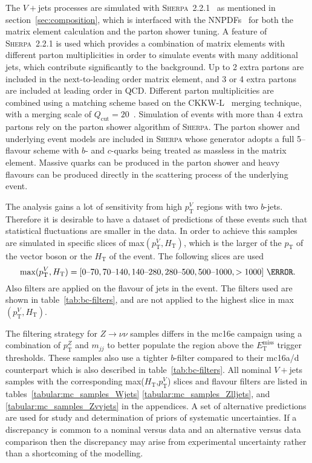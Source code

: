 The $V+$jets processes are simulated with
\textsc{Sherpa}~2.2.1~\cite{1126-6708-2009-02-007} as mentioned in
section~\ref{sec:composition}, which is interfaced with the
NNPDFs~\cite{Ball:2012cx} for both the matrix element calculation and the parton
shower tuning. A feature of \textsc{Sherpa}~2.2.1 is used which provides a
combination of matrix elements with different parton multiplicities in order to
simulate events with many additional jets, which contribute significantly to the
background. Up to 2 extra partons are included in the next-to-leading order
matrix element, and 3 or 4 extra partons are included at leading order in QCD.
Different parton multiplicities are combined using  a matching scheme based on
the CKKW-L~\cite{Lonnblad:2001iq, Lavesson:2005xu} merging technique, with a
merging scale of $Q_{\text{cut}}=20$~\GeV. Simulation of events with more than 4
extra partons rely on the parton shower algorithm of \textsc{Sherpa}. The parton
shower and underlying event models are included in \textsc{Sherpa} whose
generator adopts a full 5--flavour scheme with $b$- and $c$-quarks being treated
as massless in the matrix element. Massive quarks can be produced in the parton
shower and heavy flavours can be produced directly in the scattering process of
the underlying event.

The analysis gains a lot of sensitivity from high $p_{\mathrm{T}}^V$ regions
with two $b$-jets. Therefore it is desirable to have a dataset of predictions
of these events such that statistical fluctuations are smaller in the data. In
order to achieve this samples are simulated in specific slices of
max$(p_{\mathrm{T}}^V, H_{\mathrm{T}})$, which is the larger of the
$p_{\mathrm{T}}$ of the vector boson or the $H_{\mathrm{T}}$ of the event.
The following slices are used
\begin{equation*}
  \text{max}(p_{\mathrm{T}}^V, H_{\mathrm{T}}) =
  [0\text{--}70, 70\text{--}140, 140\text{--}280,
  280\text{--}500, 500\text{--}1000, >1000]~\GeV.
\end{equation*}
Also filters are applied on the flavour of jets in the event. The filters used
are shown in table~\ref{tab:bc-filters}, and are not applied to the highest
slice in max$(p_{\mathrm{T}}^V, H_{\mathrm{T}})$.

The filtering strategy for $Z\to\nu\nu$ samples differs in the mc16e campaign using
a combination of $p_{\mathrm{T}}^Z$ and $m_{jj}$ to better populate the region
above the $E_{\mathrm{T}}^{\text{miss}}$ trigger thresholds. These samples also
use a tighter $b$-filter compared to their mc16a/d counterpart which is also
described in table~\ref{tab:bc-filters}. All nominal $V+$jets samples with the
corresponding max($H_{\mathrm{T}}$,$p_{\mathrm{T}}^V$) slices and flavour
filters are listed in tables~\ref{tabular:mc_samples_Wjets}
\ref{tabular:mc_samples_Zlljets}, and
\ref{tabular:mc_samples_Zvvjets} in the appendices. A set of alternative
predictions are used for study and determination of priors of systematic
uncertainties. If a discrepancy is common to a nominal versus data and an
alternative versus data comparison then the discrepancy may arise from
experimental uncertainty rather than a shortcoming of the modelling.

